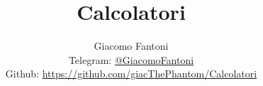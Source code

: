 
\title{\Huge \textbf{Calcolatori}}
\author{
  Giacomo Fantoni \\
  \small Telegram: \href{https://t.me/GiacomoFantoni}{@GiacomoFantoni} \\[3pt]
  \small Github: \href{https://github.com/giacThePhantom/Calcolatori}{https://github.com/giacThePhantom/Calcolatori}}

\maketitle
\tableofcontents










